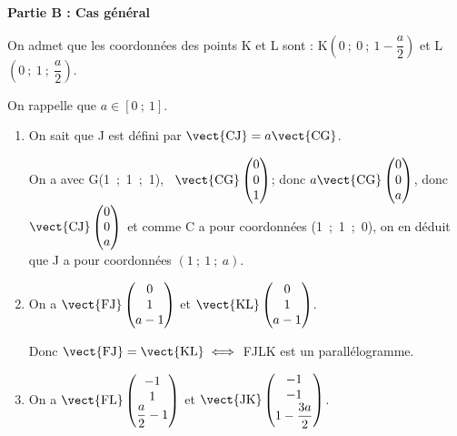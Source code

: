 \bigskip

\textbf{Partie B : Cas général}

\medskip

On admet que les coordonnées des points K et L sont : K$\left(0~;~0~;~1- \dfrac{a}{2}\right)$ et L$\left(0~;~1~;~\dfrac{a}{2}\right)$.

On rappelle que $a \in [0~;~1]$.

\medskip

\begin{enumerate}
\item %
On sait que J est défini par $\vect{\text{CJ}} = a \vect{\text{CG}}$.

On a avec G(1~;~1~;~1), \, $\vect{\text{CG}}\begin{pmatrix}0\\0\\ 1\end{pmatrix}$; donc $a \vect{\text{CG}}\begin{pmatrix}0\\0\\a\end{pmatrix}$, donc $\vect{\text{CJ}}\begin{pmatrix}0\\0\\a\end{pmatrix}$ et comme C a pour coordonnées (1~;~1~;~0), on en déduit que J a pour coordonnées $(1~;~1~;~a)$.
\item %
On a $\vect{\text{FJ}}\begin{pmatrix}0\\1\\a - 1\end{pmatrix}$ et $\vect{\text{KL}}\begin{pmatrix}0\\1\\a - 1\end{pmatrix}$.

Donc $\vect{\text{FJ}} = \vect{\text{KL}} \iff $ FJLK est un parallélogramme.
\item %
On a $\vect{\text{FL}}\begin{pmatrix}-1\\1\\\dfrac{a}{2} - 1\end{pmatrix}$ et $\vect{\text{JK}}\begin{pmatrix}- 1\\-1\\1 - \dfrac{3a}{2} \end{pmatrix}$.


\end{enumerate}
